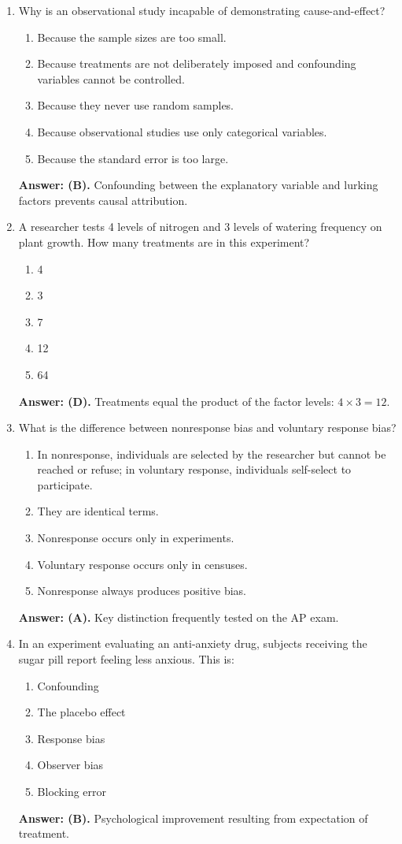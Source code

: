 \begin{enumerate}[resume, leftmargin=1.5em]
  \item Why is an observational study incapable of demonstrating cause-and-effect?
  \begin{enumerate}[label=(\Alph*)]
    \item Because the sample sizes are too small.
    \item Because treatments are not deliberately imposed and confounding variables cannot be controlled.
    \item Because they never use random samples.
    \item Because observational studies use only categorical variables.
    \item Because the standard error is too large.
  \end{enumerate}
  \textbf{Answer: (B).} Confounding between the explanatory variable and lurking factors prevents causal attribution.

  \item A researcher tests 4 levels of nitrogen and 3 levels of watering frequency on plant growth. How many treatments are in this experiment?
  \begin{enumerate}[label=(\Alph*)]
    \item 4 \item 3 \item 7 \item 12 \item 64
  \end{enumerate}
  \textbf{Answer: (D).} Treatments equal the product of the factor levels: $4 \times 3 = 12$.

  \item What is the difference between nonresponse bias and voluntary response bias?
  \begin{enumerate}[label=(\Alph*)]
    \item In nonresponse, individuals are selected by the researcher but cannot be reached or refuse; in voluntary response, individuals self-select to participate.
    \item They are identical terms.
    \item Nonresponse occurs only in experiments.
    \item Voluntary response occurs only in censuses.
    \item Nonresponse always produces positive bias.
  \end{enumerate}
  \textbf{Answer: (A).} Key distinction frequently tested on the AP exam.

  \item In an experiment evaluating an anti-anxiety drug, subjects receiving the sugar pill report feeling less anxious. This is:
  \begin{enumerate}[label=(\Alph*)]
    \item Confounding \item The placebo effect \item Response bias \item Observer bias \item Blocking error
  \end{enumerate}
  \textbf{Answer: (B).} Psychological improvement resulting from expectation of treatment.


\end{enumerate}
